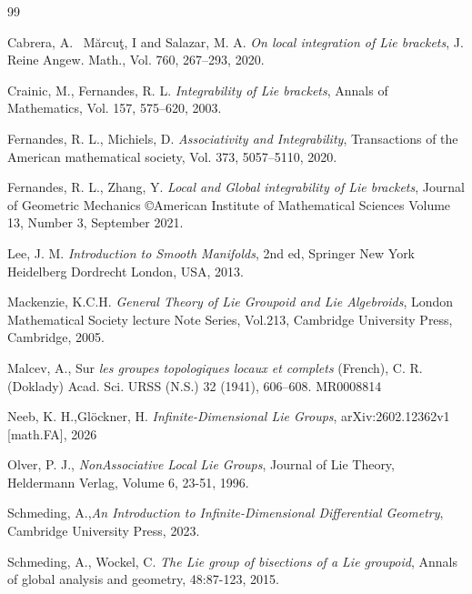 \documentclass[12pt,a4paper]{amsart}
\theoremstyle{plain}
\theoremstyle{definition}
\begin{document}
\begin{thebibliography}{99}



Cabrera, A. ~M\u{a}rcu\c{t}, I and Salazar, M. A.
\textit { On local integration of Lie brackets},
J. Reine Angew. Math., Vol. 760, 267--293, 2020.


Crainic, M., Fernandes, R. L.
\textit { Integrability of Lie brackets},
Annals of Mathematics, Vol. 157, 575--620, 2003.


Fernandes, R. L., Michiels, D.
\textit { Associativity and Integrability},
Transactions of the American mathematical society, Vol. 373, 5057--5110, 2020.


Fernandes, R. L., Zhang, Y.
\textit {Local and Global integrability of Lie brackets},
Journal of Geometric Mechanics ©American Institute of Mathematical Sciences Volume 13, Number 3, September 2021.

 Lee, J. M. \textit{Introduction to Smooth Manifolds}, 2nd ed, Springer New York Heidelberg Dordrecht London, USA, 2013.



  Mackenzie, K.C.H. \textit{General Theory of Lie Groupoid and Lie Algebroids}, London Mathematical Society lecture Note Series, Vol.213, Cambridge University Press, Cambridge, 2005. 
	

 Malcev, A., Sur \textit{les groupes topologiques locaux et complets }(French), C. R. (Doklady) Acad.
Sci. URSS (N.S.) 32 (1941), 606–608. MR0008814


Neeb, K. H.,Gl\"ockner, H.
\textit { Infinite-Dimensional Lie Groups},
 arXiv:2602.12362v1 [math.FA], 2026


  Olver,   P. J., \textit{NonAssociative Local Lie Groups}, Journal of Lie Theory, Heldermann Verlag, Volume 6, 23-51, 1996.


   Schmeding, A.,\textit{An Introduction to Infinite-Dimensional Differential Geometry}, Cambridge University Press, 2023. 
  
   Schmeding, A., Wockel, C. \textit{The Lie group of bisections of a Lie groupoid}, Annals of global analysis  and geometry, 48:87-123, 2015.                   

	\end{thebibliography}
	
\end{document}
